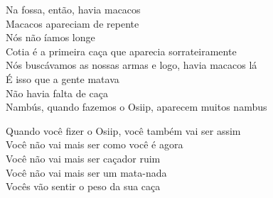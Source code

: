 \bigskip

\begin{linenumbers}\begingroup\raggedright
 
\noindent  Na fossa, então, havia macacos\\
 Macacos apareciam de repente\\
 Nós não íamos longe\\
 Cotia é a primeira caça que aparecia sorrateiramente\\
 Nós buscávamos as nossas armas e logo, havia macacos lá\\
 É isso que a gente matava\\
 Não havia falta de caça\\
 Nambús, quando fazemos o Osiip, aparecem muitos nambus
 
\end{linenumbers}\endgroup

\bigskip

\begin{linenumbers}\begingroup\raggedright
 
\noindent  Quando você fizer o Osiip, você também vai ser assim\\
 Você não vai mais ser como você é agora\\
 Você não vai mais ser caçador ruim\\
 Você não vai mais ser um mata-nada\\
 Vocês vão sentir o peso da sua caça
 
\end{linenumbers}\endgroup

